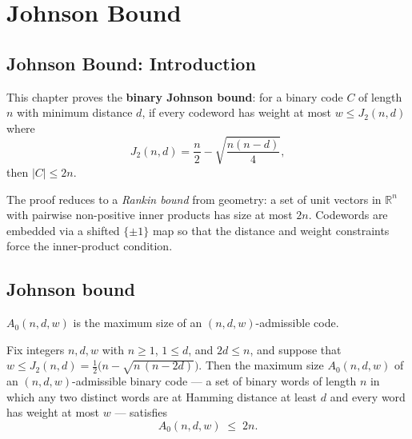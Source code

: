 \section{Johnson Bound}
\subsection*{Johnson Bound: Introduction}

This chapter proves the \textbf{binary Johnson bound}: for a binary code $C$
of length $n$ with minimum distance $d$, if every codeword has weight at most
$w \le J_2(n,d)$ where
\[
J_2(n,d) = \frac{n}{2} - \sqrt{\frac{n(n-d)}{4}},
\]
then $|C| \le 2n$.

The proof reduces to a \emph{Rankin bound} from geometry: a set of unit
vectors in $\mathbb{R}^n$ with pairwise non-positive inner products has
size at most $2n$.  Codewords are embedded via a shifted $\{\pm1\}$ map so
that the distance and weight constraints force the inner-product condition.

\subsection{Johnson bound}

\begin{definition}
\label{A0}
\leanok
{}
$A_0(n,d,w)$ is the maximum size of an $(n,d,w)$-admissible code.
\end{definition}

\begin{theorem}
\label{binary_johnson_bound_radius}
\leanok
{}
Fix integers $n, d, w$ with $n \ge 1$, $1 \le d$, and $2d \le n$, and suppose that $w
\le J_2(n,d) = \tfrac{1}{2}\bigl(n - \sqrt{n\,(n-2d)}\bigr)$. Then the maximum size
$A_0(n,d,w)$ of an $(n,d,w)$-admissible binary code — a set of binary words of length
$n$ in which any two distinct words are at Hamming distance at least $d$ and every word
has weight at most $w$ — satisfies
\[
A_0(n,d,w) \;\le\; 2n.
\]
\end{theorem}


